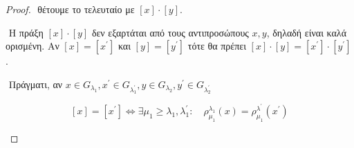 \begin{proof}
    $ $\newline
    θέτουμε το τελευταίο με $[x]\cdot [y]$.
    
    $ $\newline
    Η πράξη $[x]\cdot [y]$ δεν εξαρτάται από τους αντιπροσώπους $x,y$, δηλαδή είναι καλά ορισμένη. Αν $[x] = [x^{\prime}]$ και $[y]=[y^{\prime}]$ τότε θα πρέπει $[x]\cdot [y] = [x^{\prime}] \cdot [y^{\prime}]$.

    $ $\newline
    Πράγματι, αν $x \in G_{\lambda_1}, x^{\prime} \in G_{\lambda^{\prime}_1},y \in G_{\lambda_2}, y^{\prime} \in G_{\lambda^{\prime}_2}$
    
    $$[x] = [x^{\prime}] \iff \exists \mu_1 \geq \lambda_1, \lambda^{\prime}_1: \quad \rho^{\lambda_1}_{\mu_1}(x) = \rho^{\lambda^{\prime}}_{\mu_1} (x^{\prime})$$

    \begin{figure}[H]
        \centering
    \end{figure}


\end{proof}
